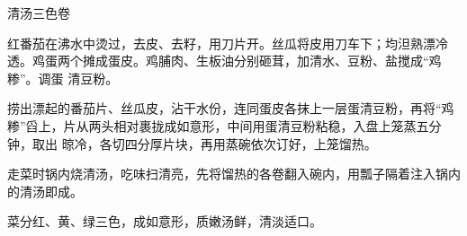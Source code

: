 %
%
%
%
%
%
%
\begin{recipe}[三色如意卷]{清汤三色卷}

\ingredients


\preparation

\step 红番茄在沸水中烫过，去皮、去籽，用刀片开。丝瓜将皮用刀车下；均泹熟漂冷
透。鸡蛋两个摊成蛋皮。鸡脯肉、生板油分别砸茸，加清水、豆粉、盐搅成“鸡糁”。调蛋
清豆粉。

\step 捞出漂起的番茄片、丝瓜皮，沾干水份，连同蛋皮各抹上一层蛋清豆粉，再将“鸡
糁”舀上，片从两头相对裹拢成如意形，中间用蛋清豆粉粘稳，入盘上笼蒸五分钟，取出
晾冷，各切四分厚片块，再用蒸碗依次订好，上笼馏热。

\step 走菜时锅内烧清汤，吃味扫清亮，先将馏热的各卷翻入碗内，用瓢子隔着注入锅内
的清汤即成。

\features

菜分红、黄、绿三色，成如意形，质嫩汤鲜，清淡适口。

\end{recipe}


